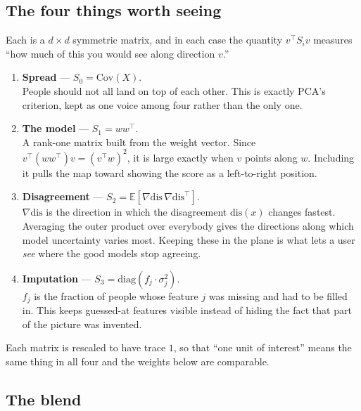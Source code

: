 \documentclass[11pt]{article}
\begin{document}
\subsection*{The four things worth seeing}

Each is a $d \times d$ symmetric matrix, and in each case the quantity $v^\top S_i v$
measures ``how much of this you would see along direction $v$.''

\begin{enumerate}[leftmargin=*, itemsep=5pt]
  \item \textbf{Spread} --- $S_0 = \mathrm{Cov}(X)$. \\
        People should not all land on top of each other. This is exactly PCA's
        criterion, kept as one voice among four rather than the only one.

  \item \textbf{The model} --- $S_1 = w w^\top$. \\
        A rank-one matrix built from the weight vector. Since
        $v^\top (w w^\top) v = (v^\top w)^2$, it is large exactly when $v$ points along
        $w$. Including it pulls the map toward showing the score as a left-to-right
        position.

  \item \textbf{Disagreement} --- $S_2 = \mathbb{E}\!\left[\nabla \mathrm{dis}\,
        \nabla \mathrm{dis}^\top\right]$. \\
        $\nabla \mathrm{dis}$ is the direction in which the disagreement
        $\mathrm{dis}(x)$ changes fastest. Averaging the outer product over everybody
        gives the directions along which model uncertainty varies most. Keeping these
        in the plane is what lets a user \emph{see} where the good models stop agreeing.

  \item \textbf{Imputation} --- $S_3 = \mathrm{diag}(f_j \cdot \sigma_j^2)$. \\
        $f_j$ is the fraction of people whose feature $j$ was missing and had to be
        filled in. This keeps guessed-at features visible instead of hiding the fact
        that part of the picture was invented.
\end{enumerate}

Each matrix is rescaled to have trace $1$, so that ``one unit of interest'' means the
same thing in all four and the weights below are comparable.

\subsection*{The blend}
\end{document}
